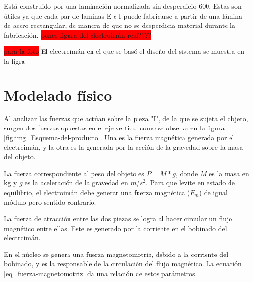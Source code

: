 \noindent Está construido por una laminación normalizada sin desperdicio 600. Estas son útiles ya que cada par de laminas E e I puede fabricarse a partir de una lámina de acero rectangular, de manera de que no se desperdicia material durante la fabricación. 
\colorbox{red}{poner figura del electroimán real????}

\noindent \colorbox{red}{para la foto} El electroimán en el que se basó el diseño del sistema se muestra en la figra

\section{Modelado físico}

\noindent Al analizar las fuerzas que actúan sobre la pieza "I", de la que se sujeta el objeto, surgen dos fuerzas opuestas en el eje vertical como se observa en la figura \ref{fig:img_Esquema-del-producto}. Una es la fuerza magnética generada por el electroimán, y la otra es la generada por la acción de la gravedad sobre la masa del objeto. 
 

\noindent La fuerza correspondiente al peso del objeto es $P=M*g$, donde $M$ es la masa en kg y $g$ es la aceleración de la gravedad en $m/s^2$. Para que levite en estado de equilibrio, el electroimán debe generar una fuerza magnética ($F_{m}$) de igual módulo pero sentido contrario.

\noindent La fuerza de atracción entre las dos piezas se logra al hacer circular un flujo magnético entre ellas. Este es generado por la corriente en el bobinado del electroimán.

\noindent En el núcleo se genera una fuerza magnetomotriz, debido a la corriente del bobinado, y es la responsable de la circulación del flujo magnético. La ecuación \ref{eq_fuerza-magnetomotriz} da una relación de estos parámetros.	


